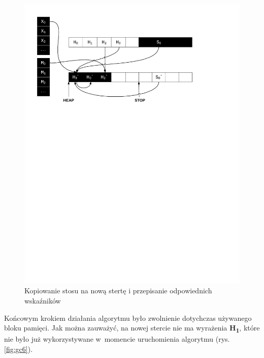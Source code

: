 \begin{figure}[h]
\centerline{\includegraphics[scale=0.75, clip, trim=10mm 180mm 45mm 10mm]{gc_5}}
\caption{Kopiowanie stosu na nową stertę i przepisanie odpowiednich wskaźników}
\label{fig:gc5}
\end{figure}

Końcowym krokiem działania algorytmu było zwolnienie dotychczas używanego bloku pamięci. Jak można zauważyć, na nowej stercie nie ma wyrażenia \textbf{H\textsubscript{1}}, które nie było już wykorzystywane w~momencie uruchomienia algorytmu (rys. \ref{fig:gc6}).

